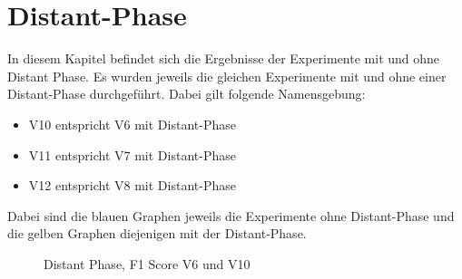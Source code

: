 
\section{Distant-Phase}
In diesem Kapitel befindet sich die Ergebnisse der Experimente mit und ohne Distant Phase. Es wurden jeweils die gleichen Experimente mit und ohne einer Distant-Phase durchgeführt. Dabei gilt folgende Namensgebung:
\begin{itemize}  
	\item V10 entspricht V6 mit Distant-Phase
	\item V11 entspricht V7 mit Distant-Phase
	\item V12 entspricht V8 mit Distant-Phase
\end{itemize}
Dabei sind die blauen Graphen jeweils die Experimente ohne Distant-Phase und die gelben Graphen diejenigen mit der Distant-Phase.

\begin{figure}
	\centering
	\caption{Distant Phase, F1 Score V6 und V10}
	\label{fig:Results V6 und V10}
\end{figure}

